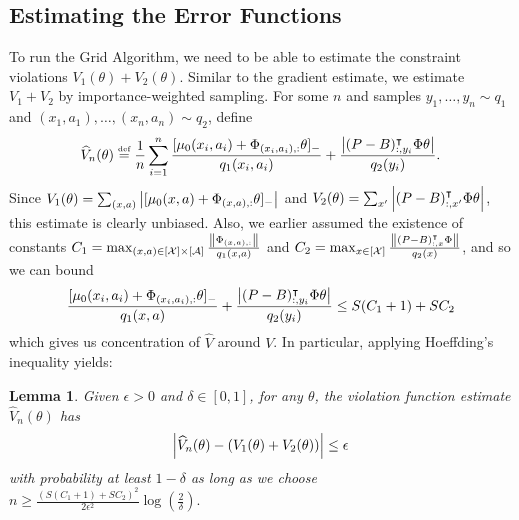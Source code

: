\documentclass[11pt]{article}
\newtheorem{lemma}[theorem]{Lemma}
\newcommand{\df}{\stackrel{\mbox{\rm\tiny def}}{=}}
\begin{document}
\subsection{Estimating the Error Functions}
\label{sec:estimate.V.average}
To run the Grid Algorithm, we need to be able to estimate the constraint violations $V_1(\theta)+V_2(\theta)$.
Similar to the gradient estimate, we estimate $V_1+V_2$ by importance-weighted sampling.
For some $n$ and samples $y_1,\ldots, y_n\sim q_1$ and $(x_1,a_1),\ldots,(x_n,a_n)\sim q_2$, define
\begin{equation}
  \widehat V_n(\theta) \df \frac{1}{n}\sum_{i=1}^n  \frac{[\mu_0(x_i,a_i)+\Phi_{(x_i,a_i),:}\theta]_-}{q_1(x_i,a_i)}
  +\frac{\abs{(P-B)_{:,y_i}^\top \Phi\theta}}{q_2(y_i)} .
\end{equation}
Since $  V_1(\theta) =\sum_{(x,a)} \left\vert [\mu_0(x,a) + \Phi_{(x,a),:}\theta]_{-}\right\vert$ and
  $V_2(\theta) = \sum_{x'} \left\vert(P- B)_{:,x'}^\intercal \Phi \theta \right\vert$, this estimate is clearly unbiased. Also, we earlier assumed the existence of constants
  $C_1 = \max_{(x,a)\in [{\cal X}]\times [{\cal A}]}\frac{\left\Vert\Phi_{(x,a),:}\right\Vert}{q_1(x, a)}$
and $C_2 = \max_{x\in [{\cal X}]}\frac{\left\Vert(P - B)_{:,x}^\intercal \Phi\right\Vert}{q_2(x)}$, and so we can bound
\begin{align*}
\frac{[\mu_0(x_i,a_i)+\Phi_{(x_i,a_i),:}\theta]_-}{q_1(x,a)}
  +\frac{\left\vert(P-B)_{:,y_i}^\intercal \Phi\theta\right\vert}{q_2(y_i)}
  \leq
  S(C_1+1) + SC_2
\end{align*}
which gives us concentration of $\widehat V$ around $V$. In particular, applying Hoeffding's inequality yields:
\begin{lemma}
  \label{lem:V_hat_error}
  Given $\epsilon>0$ and $\delta \in [0,1]$, for any $\theta$, the violation function estimate $\widehat V_n(\theta)$ has
  \begin{equation*}
    \left\vert\widehat V_n(\theta) - (V_1(\theta)+V_2(\theta))\right\vert \leq \epsilon
  \end{equation*}
    with probability at least $1-\delta$ as long as we choose
  $
    n \geq  \frac{(S(C_1+1) + SC_2)^2}{2\epsilon^2}\log\left(\frac{2}{\delta}\right).
  $
\end{lemma}
\end{document}

